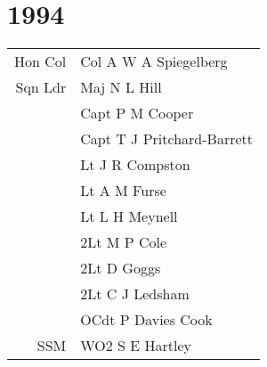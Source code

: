 \chapter*{1994}

\vspace*{10mm}

\begin{center}
  \begin{tabular}{rl}
    Hon Col & Col A W A Spiegelberg \\
    Sqn Ldr & Maj N L Hill \\
    & Capt P M Cooper \\
    & Capt T J Pritchard-Barrett \\
    & Lt J R Compston \\
    & Lt A M Furse \\
    & Lt L H Meynell \\
    & 2Lt M P Cole \\
    & 2Lt D Goggs \\
    & 2Lt C J Ledsham \\
    & OCdt P Davies Cook \\
    SSM & WO2 S E Hartley \\
  \end{tabular}
\end{center}

\vspace*{10mm}

